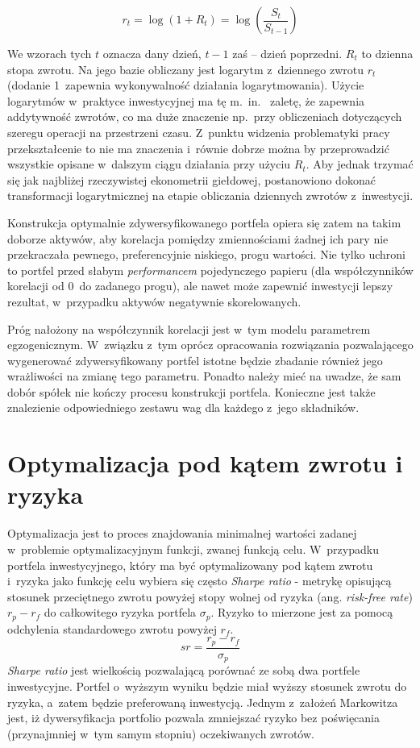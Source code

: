 \documentclass[12pt,a4paper,twoside,openany]{book}
\begin{document}
\begin{equation}
    r_t  = \log(1 + R_t)  = \log(\frac{S_t}{S_{t-1}})
\end{equation}

We wzorach tych $t$ oznacza dany dzień, $t-1$ zaś -- dzień poprzedni.
$R_t$ to dzienna stopa zwrotu.
Na jego bazie obliczany jest logarytm z~dziennego zwrotu $r_t$ (dodanie 1~zapewnia wykonywalność działania logarytmowania).
Użycie logarytmów w~praktyce inwestycyjnej ma tę m.~in.~ zaletę, że zapewnia addytywność zwrotów, co ma duże znaczenie np.~przy obliczeniach dotyczących szeregu operacji na przestrzeni czasu.
Z~punktu widzenia problematyki pracy przekształcenie to nie ma znaczenia i~równie dobrze można by przeprowadzić wszystkie opisane w~dalszym ciągu działania przy użyciu $R_t$. 
Aby jednak trzymać się jak najbliżej rzeczywistej ekonometrii giełdowej, postanowiono dokonać transformacji logarytmicznej na etapie obliczania dziennych zwrotów z~inwestycji.

Konstrukcja optymalnie zdywersyfikowanego portfela opiera się zatem na takim doborze aktywów, aby korelacja pomiędzy zmiennościami żadnej ich pary nie przekraczała pewnego, preferencyjnie niskiego, progu wartości. 
Nie tylko uchroni to portfel przed słabym \textit{performancem} pojedynczego papieru (dla współczynników korelacji od 0~do zadanego progu), ale nawet może zapewnić inwestycji lepszy rezultat, w~przypadku aktywów negatywnie skorelowanych.

Próg nałożony na współczynnik korelacji jest w~tym modelu parametrem egzogenicznym.
W~związku z~tym oprócz opracowania rozwiązania pozwalającego wygenerować zdywersyfikowany portfel istotne będzie zbadanie również jego wrażliwości na zmianę tego parametru.
Ponadto należy mieć na uwadze, że sam dobór spółek nie kończy procesu konstrukcji portfela.
Konieczne jest także znalezienie odpowiedniego zestawu wag dla każdego z~jego składników.

\section{Optymalizacja pod kątem zwrotu i ryzyka}

Optymalizacja jest to proces znajdowania minimalnej wartości zadanej w~problemie optymalizacyjnym funkcji, zwanej funkcją celu.
W~przypadku portfela inwestycyjnego, który ma być optymalizowany pod kątem zwrotu i~ryzyka jako funkcję celu wybiera się często \textit{Sharpe ratio} - metrykę opisującą stosunek przeciętnego zwrotu powyżej stopy wolnej od ryzyka (ang. \textit{risk-free rate}) $r_p - r_f$ do całkowitego ryzyka portfela $\sigma_p$.
Ryzyko to mierzone jest za pomocą odchylenia standardowego zwrotu powyżej $r_f$.
\begin{equation}
    sr = \frac{r_p - r_f}{\sigma_p}
\end{equation}
\textit{Sharpe ratio} jest wielkością pozwalającą porównać ze sobą dwa portfele inwestycyjne.
Portfel o~wyższym wyniku będzie miał wyższy stosunek zwrotu do ryzyka, a~zatem będzie preferowaną inwestycją.
Jednym z~założeń Markowitza jest, iż dywersyfikacja portfolio pozwala zmniejszać ryzyko bez poświęcania (przynajmniej w~tym samym stopniu) oczekiwanych zwrotów.
\end{document}
